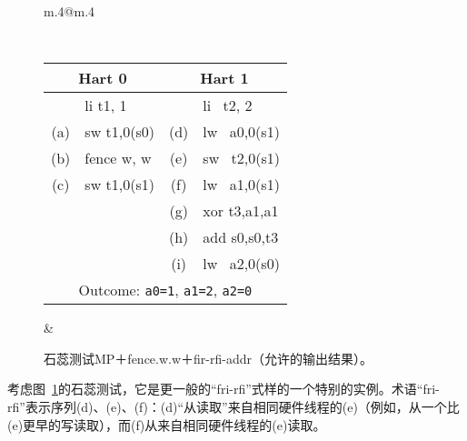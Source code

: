 \begin{figure}[h!]
  \center
  \begin{tabular}{m{.4\linewidth}@{\qquad}m{.4\linewidth}}
    {\tt\small
    \begin{tabular}{cl||cl}
    \multicolumn{2}{c}{Hart 0} & \multicolumn{2}{c}{Hart 1} \\
    \hline
          & li t1, 1    &     & li~ t2, 2    \\
      (a) & sw t1,0(s0) & (d) & lw~ a0,0(s1) \\
      (b) & fence w, w  & (e) & sw~ t2,0(s1) \\
      (c) & sw t1,0(s1) & (f) & lw~ a1,0(s1) \\
          &             & (g) & xor t3,a1,a1 \\
          &             & (h) & add s0,s0,t3 \\
          &             & (i) & lw~ a2,0(s0) \\
      \hline
      \multicolumn{4}{c}{Outcome: {\tt a0=1}, {\tt a1=2}, {\tt a2=0}}
    \end{tabular}
  }
  &
  
  \end{tabular}
  \caption{石蕊测试MP＋fence.w.w＋fir-rfi-addr（允许的输出结果）。 
  }
  \label{fig:litmus:frirfi}
\end{figure}

考虑图~\ref{fig:litmus:frirfi}的石蕊测试，它是更一般的“fri-rfi”式样的一个特别的实例。术语“fri-rfi”表示序列(d)、(e)、(f)：(d)“从读取”来自相同硬件线程的(e)（例如，从一个比(e)更早的写读取），而(f)从来自相同硬件线程的(e)读取。

